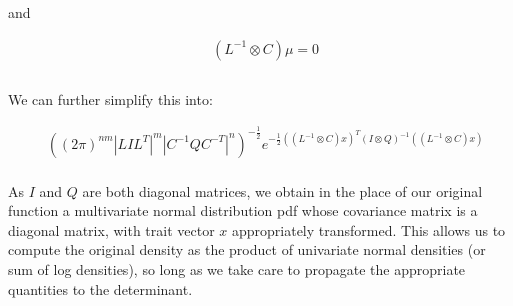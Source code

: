 \documentclass[10pt]{article}
\begin{document}
and

\begin{align*}
&(L^{-1} \otimes C)\mu = 0\\
\\
\end{align*}

We can further simplify this into:

\begin{align*}
&((2\pi)^{nm}|LIL^T|^m |C^{-1}QC^{-T}|^n)^{-\frac{1}{2}}e^{-\frac{1}{2}((L^{-1} \otimes C)x)^{T}(I \otimes Q)^{-1}((L^{-1} \otimes C)x)}\\
\end{align*}

As $I$ and $Q$ are both diagonal matrices, we obtain in the place of our original function a multivariate normal distribution pdf whose covariance matrix is a diagonal matrix, with trait vector $x$ appropriately transformed. This allows us to compute the original density as the product of univariate normal densities (or sum of log densities), so long as we take care to propagate the appropriate quantities to the determinant. 
\end{document}
